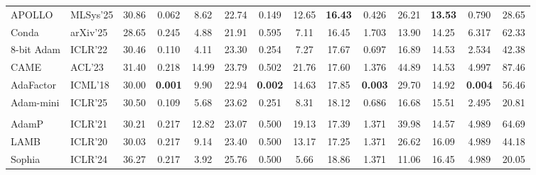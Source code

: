 \begin{table}[!t]
{\begin{tabular}{ll|ccc|ccc|ccc|ccc}
APOLLO & MLSys'25 & 30.86 & 0.062 & 8.62 & 22.74 & 0.149 & 12.65 & \cellcolor{bestbg}\textbf{16.43} & 0.426 & 26.21 & \cellcolor{bestbg}\textbf{13.53} & 0.790 & 28.65 \\
Conda & arXiv'25 & \cellcolor{bestbg}28.65 & 0.245 & 4.88 & \cellcolor{bestbg}21.91 & 0.595 & 7.11 & \cellcolor{bestbg}16.45 & 1.703 & 13.90 & 14.25 & 6.317 & 62.33 \\
8-bit Adam & ICLR'22 & 30.46 & 0.110 & 4.11 & 23.30 & 0.254 & 7.27 & 17.67 & 0.697 & 16.89 & 14.53 & 2.534 & 42.38 \\
CAME & ACL'23 & 31.40 & 0.218 & 14.99 & 23.79 & 0.502 & 21.76 & 17.60 & 1.376 & 44.89 & 14.53 & 4.997 & 87.46 \\
AdaFactor & ICML'18 & 30.00 & \cellcolor{bestbg}\textbf{0.001} & 9.90 & 22.94 & \cellcolor{bestbg}\textbf{0.002} & 14.63 & 17.85 & \cellcolor{bestbg}\textbf{0.003} & 29.70 & 14.92 & \cellcolor{bestbg}\textbf{0.004} & 56.46 \\
Adam-mini & ICLR'25 & 30.50 & 0.109 & 5.68 & 23.62 & 0.251 & 8.31 & 18.12 & 0.686 & 16.68 & 15.51 & 2.495 & 20.81 \\
\midrule
\rowcolor{famT5!18}\multicolumn{14}{c}{\textbf{\textcolor{famT5!62!black}{\textit{T5: Curvature-aware and geometric regularization}}}} \\
AdamP & ICLR'21 & 30.21 & 0.217 & 12.82 & 23.07 & 0.500 & 19.13 & 17.39 & 1.371 & 39.98 & 14.57 & 4.989 & 64.69 \\
LAMB & ICLR'20 & 30.03 & 0.217 & 9.14 & 23.40 & 0.500 & 13.17 & 17.25 & 1.371 & 26.62 & 16.09 & 4.989 & 44.18 \\
Sophia & ICLR'24 & \cellcolor{worstbg}36.27 & 0.217 & 3.92 & \cellcolor{worstbg}25.76 & 0.500 & 5.66 & 18.86 & 1.371 & 11.06 & 16.45 & 4.989 & 20.05 \\
\bottomrule
\end{tabular}}
\end{table}